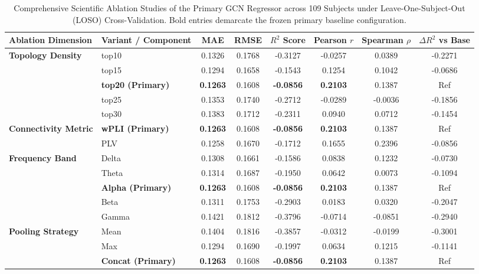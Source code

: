 \begin{table}[t]
\centering
\caption{Comprehensive Scientific Ablation Studies of the Primary GCN Regressor across 109 Subjects under Leave-One-Subject-Out (LOSO) Cross-Validation. Bold entries demarcate the frozen primary baseline configuration.}
\label{tab:gcn_ablations}
\small
\begin{tabular}{llcccccc}
\toprule
\textbf{Ablation Dimension} & \textbf{Variant / Component} & \textbf{MAE} & \textbf{RMSE} & \textbf{$R^2$ Score} & \textbf{Pearson $r$} & \textbf{Spearman $\rho$} & \textbf{$\Delta R^2$ vs Base} \\
\midrule
  \multirow{1}{*}{\textbf{Topology Density}} & top10 & 0.1326 & 0.1768 & -0.3127 & -0.0257 & 0.0389 & -0.2271 \\
   & top15 & 0.1294 & 0.1658 & -0.1543 & 0.1254 & 0.1042 & -0.0686 \\
   & \textbf{top20 (Primary)} & \textbf{0.1263} & 0.1608 & \textbf{-0.0856} & \textbf{0.2103} & 0.1387 & Ref \\
   & top25 & 0.1353 & 0.1740 & -0.2712 & -0.0289 & -0.0036 & -0.1856 \\
   & top30 & 0.1383 & 0.1712 & -0.2311 & 0.0940 & 0.0712 & -0.1454 \\
\midrule
  \multirow{1}{*}{\textbf{Connectivity Metric}} & \textbf{wPLI (Primary)} & \textbf{0.1263} & 0.1608 & \textbf{-0.0856} & \textbf{0.2103} & 0.1387 & Ref \\
   & PLV & 0.1258 & 0.1670 & -0.1712 & 0.1655 & 0.2396 & -0.0856 \\
\midrule
  \multirow{1}{*}{\textbf{Frequency Band}} & Delta & 0.1308 & 0.1661 & -0.1586 & 0.0838 & 0.1232 & -0.0730 \\
   & Theta & 0.1314 & 0.1687 & -0.1950 & 0.0642 & 0.0073 & -0.1094 \\
   & \textbf{Alpha (Primary)} & \textbf{0.1263} & 0.1608 & \textbf{-0.0856} & \textbf{0.2103} & 0.1387 & Ref \\
   & Beta & 0.1311 & 0.1753 & -0.2903 & 0.0183 & 0.0320 & -0.2047 \\
   & Gamma & 0.1421 & 0.1812 & -0.3796 & -0.0714 & -0.0851 & -0.2940 \\
\midrule
  \multirow{1}{*}{\textbf{Pooling Strategy}} & Mean & 0.1404 & 0.1816 & -0.3857 & -0.0312 & -0.0199 & -0.3001 \\
   & Max & 0.1294 & 0.1690 & -0.1997 & 0.0634 & 0.1215 & -0.1141 \\
   & \textbf{Concat (Primary)} & \textbf{0.1263} & 0.1608 & \textbf{-0.0856} & \textbf{0.2103} & 0.1387 & Ref \\

\end{tabular}
\end{table}
